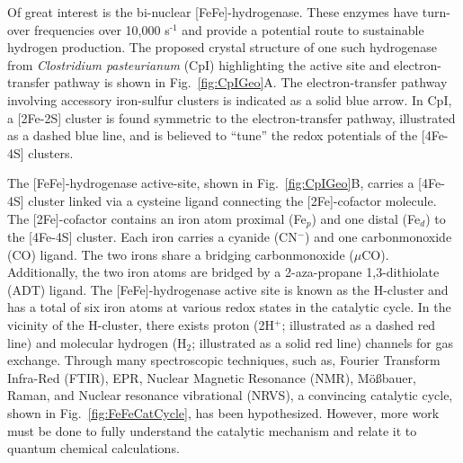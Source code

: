 Of great interest is the bi-nuclear [FeFe]-hydrogenase. \cite{PETERS20151350} These enzymes have turn-over frequencies over 10,000 s$^{\text{-1}}$\cite{CatalyticTOF} and provide a potential route to sustainable hydrogen production. The proposed crystal structure of one such hydrogenase from {\em Clostridium pasteurianum} (CpI) highlighting the active site and electron-transfer pathway is shown in Fig.~\ref{fig:CpIGeo}A. \cite{FeFeCry} The electron-transfer pathway involving accessory iron-sulfur clusters is indicated as a solid blue arrow. In CpI, a [2Fe-2S] cluster is found symmetric to the electron-transfer pathway, illustrated as a dashed blue line, and is believed to ``tune'' the redox potentials of the [4Fe-4S] clusters. \cite{PetersPotentials} 

The [FeFe]-hydrogenase active-site, shown in Fig.~\ref{fig:CpIGeo}B, carries a [4Fe-4S] cluster linked via a cysteine ligand connecting the [2Fe]-cofactor molecule. The [2Fe]-cofactor contains an iron atom proximal (Fe$_p$) and one distal (Fe$_d$) to the [4Fe-4S] cluster. Each iron carries a cyanide (CN$^-$) and one carbonmonoxide (CO) ligand. The two irons share a bridging carbonmonoxide ($\mu$CO). Additionally, the two iron atoms are bridged by a 2-aza-propane 1,3-dithiolate (ADT) ligand. The [FeFe]-hydrogenase active site is known as the H-cluster and has a total of six iron atoms at various redox states in the catalytic cycle. In the vicinity of the H-cluster, there exists proton (2H$^+$; illustrated as a dashed red line) and molecular hydrogen (H$_2$; illustrated as a solid red line) channels for gas exchange. Through many spectroscopic techniques, such as, Fourier Transform Infra-Red (FTIR), EPR, Nuclear Magnetic Resonance (NMR), M\"o\ss{}bauer, Raman, and Nuclear resonance vibrational (NRVS), a convincing catalytic cycle, shown in Fig.~\ref{fig:FeFeCatCycle}, has been hypothesized. \cite{lubitzhyd, NRVS2017, sommer2017} However, more work must be done to fully understand the catalytic mechanism and relate it to quantum chemical calculations. 

